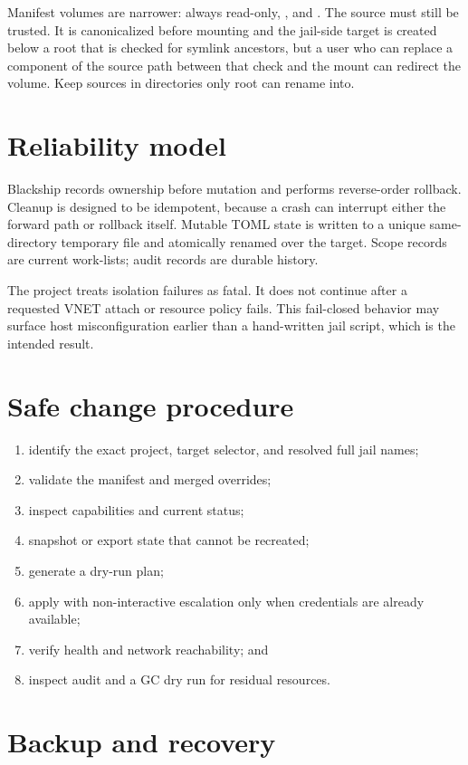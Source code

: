 Manifest volumes are narrower: always read-only, , and
. The source must still be trusted. It is canonicalized before
mounting and the jail-side target is created below a root that is checked for
symlink ancestors, but a user who can replace a component of the source path
between that check and the mount can redirect the volume. Keep sources in
directories only root can rename into.

\section{Reliability model}

Blackship records ownership before mutation and performs reverse-order rollback.
Cleanup is designed to be idempotent, because a crash can interrupt either the
forward path or rollback itself. Mutable TOML state is written to a unique
same-directory temporary file and atomically renamed over the target. Scope
records are current work-lists; audit records are durable history.

The project treats isolation failures as fatal. It does not continue after a
requested VNET attach or resource policy fails. This fail-closed behavior may
surface host misconfiguration earlier than a hand-written jail script, which is
the intended result.

\section{Safe change procedure}

\begin{enumerate}
  \item identify the exact project, target selector, and resolved full jail names;
  \item validate the manifest and merged overrides;
  \item inspect capabilities and current status;
  \item snapshot or export state that cannot be recreated;
  \item generate a dry-run plan;
  \item apply with non-interactive escalation only when credentials are already
    available;
  \item verify health and network reachability; and
  \item inspect audit and a GC dry run for residual resources.
\end{enumerate}

\section{Backup and recovery}

